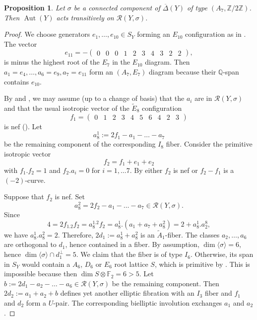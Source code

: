 \documentclass[a4paper]{amsart}
\theoremstyle{definition}
\theoremstyle{plain}
\newtheorem{proposition}[definition]{Proposition}
\DeclareMathOperator{\Aut}{Aut}
\newcommand{\QQ}{\mathbb{Q}}
\newcommand{\FF}{\mathbb{F}}
\newcommand{\ZZ}{\mathbb{Z}}
\newcommand{\R}{\mathcal{R}}
\newcommand{\DeltabarY}{\overline{\Delta}(Y)}
\begin{document}
\begin{proposition}
    Let $\sigma$ be a connected component of $\DeltabarY$ of type $(A_7, \ZZ/2\ZZ)$. 
    Then $\Aut(Y)$ acts transitively on $\R(Y,\sigma)$.
\end{proposition}
\begin{proof}
We choose generators $e_1,\dots, e_{10} \in S_Y$ forming an $E_{10}$ configuration as in .
The vector
\[e_{11} = -\begin{pmatrix}
    0 & 0 & 0 & 1 & 2 & 3 & 4 & 3 & 2 & 2
\end{pmatrix},\]
is minus the highest root of the $E_7$ in the $E_{10}$ diagram. 
Then $a_1=e_4,\dots, a_6=e_9, a_7=e_{11}$ form an $(A_7,E_7)$ diagram because their $\QQ$-span contains $e_{10}$.

By  and , we may assume (up to a change of basis) that the $a_i$ are in $\R(Y,\sigma)$ and that the usual isotropic vector of the $\widetilde{E}_8$ configuration
\[f_1= \begin{pmatrix}
0&1&2&3&4&5&6&4&2&3
\end{pmatrix}
\]
is nef (). Let 
\[a_8^1:= 2f_1 - a_1-\dots - a_7\] 
be the remaining component of the corresponding $I_8$ fiber.
Consider the primitive isotropic vector
\[f_2 = f_1+e_1+e_2\]
with $f_1.f_2=1$ and $f_2.a_i=0$ for $i=1,\dots 7$. 
By  either $f_2$ is nef or $f_2-f_1$ is a $(-2)$-curve.
   
Suppose that $f_2$ is nef. Set 
\[a_8^2 = 2f_2-a_1 - \dots - a_7 \in \R(Y,\sigma).\]
Since 
\[4 = 2f_1.2f_2 = a_8^1.2f_2 = a_8^1.(a_1+a_7+a_8^2)=2+a_8^1.a^8_2,\]
we have $a_8^1.a_8^2=2$.
Therefore, $2d_1:=a_8^1+a_8^2$ is an $\widetilde{A}_1$-fiber. The classes $a_2,\dots ,a_6$ are orthogonal to $d_1$, hence contained in a fiber. By assumption, $\dim \langle \sigma \rangle = 6$, hence $\dim \langle \sigma \rangle \cap d_1^\perp= 5$. We claim that the fiber is of type $I_6$. Otherwise, its span in $S_Y$ would contain a $A_6$, $D_6$ or $E_6$ root lattice $S$, which is primitive by . This is impossible because then $\dim S\otimes \FF_2 =6 > 5$. Let $b:=2d_1 - a_2-\dots -a_6 \in \R(Y,\sigma)$ be the remaining component.
Then $2 d_2 := a_1+a_2+b$ defines yet another elliptic fibration with an $I_3$ fiber and $f_1$ and $d_2$ form a $U$-pair. The corresponding bielliptic involution exchanges $a_1$ and $a_2$.


\end{proof}
\end{document}
